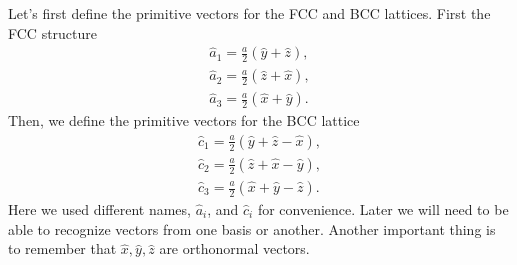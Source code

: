 
\begin{questions}
\begin{solution}
  Let's first define the primitive vectors for the FCC and BCC lattices. First the FCC structure
  \begin{eqnarray}
     \hat{a}_1 = \frac{a}{2}\left(\hat{y} + \hat{z}\right), \label{a1}\\
     \hat{a}_2 = \frac{a}{2}\left(\hat{z} + \hat{x}\right), \label{a2}\\
     \hat{a}_3 = \frac{a}{2}\left(\hat{x} + \hat{y}\right). \label{a3}
  \end{eqnarray}
  Then, we define the primitive vectors for the BCC lattice
  \begin{eqnarray}
     \hat{c}_1 = \frac{a}{2}\left(\hat{y} + \hat{z} - \hat{x}\right), \label{c1}\\
     \hat{c}_2 = \frac{a}{2}\left(\hat{z} + \hat{x} - \hat{y}\right), \label{c2}\\
     \hat{c}_3 = \frac{a}{2}\left(\hat{x} + \hat{y} - \hat{z}\right). \label{c3}
  \end{eqnarray}
  Here we used different names, $\hat{a}_i$, and $\hat{c}_i$ for convenience. Later we will need to be able to recognize vectors from one basis or another. Another important thing is to remember that $\hat{x}, \hat{y}, \hat{z}$ are orthonormal vectors.


\end{solution}
\end{questions}
